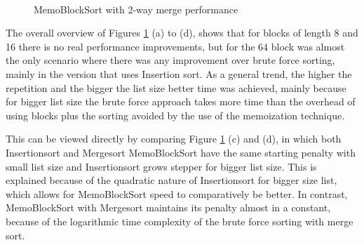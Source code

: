 \documentclass[a4paper,12pt]{article}
\begin{document}
\begin{figure}[H]
\\ %
%
\hfill %
%
\caption{MemoBlockSort with 2-way merge performance}
\label{fig:MemoBlockSort2WayGraph}
\end{figure}

The overall overview of Figures \ref{fig:MemoBlockSort2WayGraph} (a) to (d), shows that for blocks of length 8 and 16 there is no real performance improvements, but for the 64 block was almost the only scenario where there was any improvement over brute force sorting, mainly in the version that uses Insertion sort. 
As a general trend, the higher the repetition and the bigger the list size better time was achieved, mainly because for bigger list size the brute force approach takes more time than the overhead of using blocks plus the sorting avoided by the use of the memoization technique.

This can be viewed directly by comparing Figure \ref{fig:MemoBlockSort2WayGraph} (c) and (d), in which both Insertionsort and Mergesort MemoBlockSort have the same starting penalty with small list size and Insertionsort grows stepper for bigger list size. This is explained because of the quadratic nature of Insertionsort for bigger size list, which allows for MemoBlockSort speed to comparatively be better. In contrast, MemoBlockSort with Mergesort maintains its penalty almost in a constant, because of the logarithmic time complexity of the brute force sorting with merge sort.\\
\end{document}
